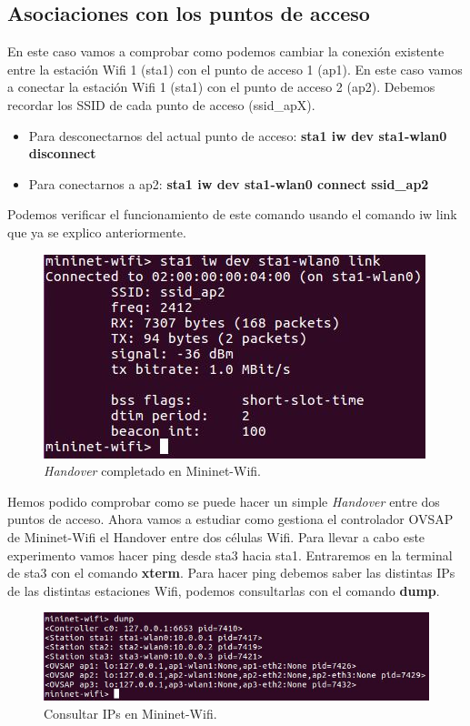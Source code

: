 \subsection{Asociaciones con los puntos de acceso}
En este caso vamos a comprobar como podemos cambiar la conexión existente entre la estación Wifi 1 (sta1) con el punto de acceso 1 (ap1). En este caso vamos a conectar la estación Wifi 1 (sta1) con el punto de acceso 2 (ap2). Debemos recordar los SSID de cada punto de acceso (ssid\_apX).\newline
\newline
\begin{center}
\begin{itemize}
    \item  Para desconectarnos del actual punto de acceso:  \textbf{sta1 iw dev sta1-wlan0 disconnect}
    \item Para conectarnos a ap2: \textbf{sta1 iw dev sta1-wlan0 connect ssid\_ap2}
\end{itemize}
\end{center}
Podemos verificar el funcionamiento de este comando usando el comando iw link que ya se explico anteriormente.
\begin{figure}[!htb]
  \centering
    \includegraphics[width=0.5\linewidth]{./img/12.JPG}
    \caption{\textit{Handover} completado en Mininet-Wifi.}
  \label{fig:yo}
\end{figure}
Hemos podido comprobar como se puede hacer un simple \textit{Handover} entre dos puntos de acceso.
\newpage
Ahora vamos a estudiar como gestiona el controlador OVSAP de Mininet-Wifi el Handover entre dos células Wifi. Para llevar a cabo este experimento vamos hacer ping desde sta3 hacia sta1. Entraremos en la terminal de sta3 con el comando \textbf{xterm}. Para hacer ping debemos saber las distintas IPs de las distintas estaciones Wifi, podemos consultarlas con el comando \textbf{dump}.
\begin{figure}[!htb]
  \centering
    \includegraphics[width=\linewidth]{./img/13.JPG}
    \caption{Consultar IPs en Mininet-Wifi.}
  \label{fig:yo}
\end{figure}

